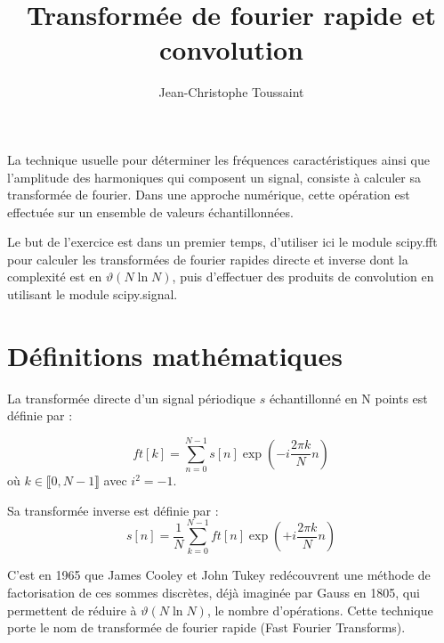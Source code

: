 \documentclass[a4paper, 12pt]{article}
\begin{document}


\title{Transformée de fourier rapide et convolution}

\author{Jean-Christophe Toussaint
}
 
\maketitle

La technique usuelle pour déterminer les fréquences caractéristiques ainsi que l’amplitude des harmoniques qui composent un signal, consiste à calculer sa transformée de fourier. Dans une approche numérique, cette opération est effectuée sur un ensemble de valeurs échantillonnées.

Le but de l'exercice est dans un premier temps, d'utiliser ici le module scipy.fft pour calculer les transformées de fourier rapides directe et inverse dont la complexité est en $\vartheta(N \ln N)$,
puis d'effectuer des produits de convolution en utilisant le module scipy.signal.



\section{Définitions mathématiques}

La transformée directe d'un signal périodique $s$ échantillonné en N points 
est définie par :

\begin{equation} 
ft[k]=\sum_{n=0}^{N-1}  s[n] \exp \left(-i \frac{2\pi k}{N}n \right)
\end{equation} 
où $k \in  \llbracket  0, N-1 \rrbracket $ avec $i^2=-1$.

Sa transformée inverse est définie par :
\begin{equation} 
s[n]=\frac{1}{N} \sum_{k=0}^{N-1}  ft[n] \exp \left(+i \frac{2\pi k}{N}n \right)
\end{equation}

C'est en 1965 que  James Cooley et John Tukey redécouvrent une méthode de factorisation de ces sommes
discrètes, déjà imaginée par Gauss en 1805, qui permettent de réduire à $\vartheta(N \ln N)$, le nombre d'opérations.
Cette technique porte le nom de transformée de fourier rapide (Fast Fourier Transforms).
\end{document}
